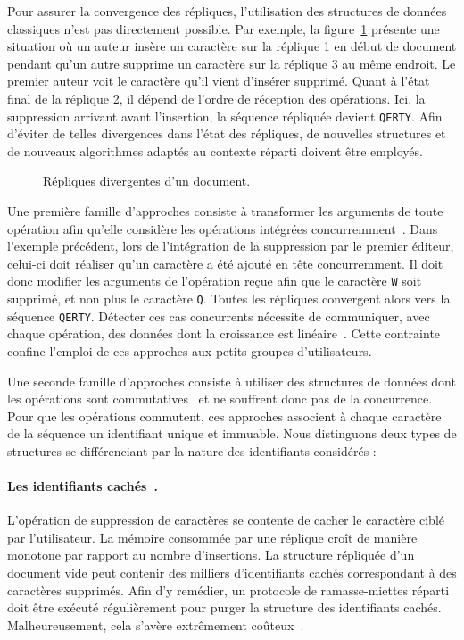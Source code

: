 Pour assurer la convergence des répliques, l'utilisation des structures de
données \og classiques \fg n'est pas directement possible.
Par exemple, la figure~\ref{intro:fig:ripconvergence} présente une situation où
un auteur insère un caractère sur la réplique 1 en début de document pendant
qu'un autre supprime un caractère sur la réplique 3 au même endroit. Le premier
auteur voit le caractère qu'il vient d'insérer supprimé. Quant à l'état final de
la réplique 2, il dépend de l'ordre de réception des opérations. Ici, la
suppression arrivant avant l'insertion, la séquence répliquée devient
\texttt{QERTY}.  Afin d'éviter de telles divergences dans l'état des répliques,
de nouvelles structures et de nouveaux algorithmes adaptés au contexte réparti
doivent être employés.


\begin{figure}
  
  \caption{\label{intro:fig:ripconvergence} Répliques divergentes d'un
    document.}
\end{figure}


Une première famille d'approches consiste à transformer les arguments de toute
opération afin qu'elle considère les opérations intégrées
concurremment~\cite{sun1998operational}. Dans l'exemple précédent, lors de
l'intégration de la suppression par le premier éditeur, celui-ci doit réaliser
qu'un caractère a été ajouté en tête concurremment. Il doit donc modifier les
arguments de l'opération reçue afin que le caractère \texttt{W} soit supprimé,
et non plus le caractère \texttt{Q}. Toutes les répliques convergent alors vers
la séquence \texttt{QERTY}.  Détecter ces cas concurrents nécessite de
communiquer, avec chaque opération, des données dont la croissance est
linéaire~\cite{charronbost1991concerning, sun2009contextbased}. Cette contrainte
confine l'emploi de ces approches aux petits groupes d'utilisateurs.

Une seconde famille d'approches consiste à utiliser des structures de données
dont les opérations sont commutatives~\cite{shapiro2011conflict} et ne souffrent
donc pas de la concurrence. Pour que les opérations commutent, ces approches
associent à chaque caractère de la séquence un identifiant unique et
immuable. Nous distinguons deux types de structures se différenciant par la
nature des identifiants considérés :

\paragraph{Les identifiants cachés~\cite{oster2006data}.} L'opération de
suppression de caractères se contente de cacher le caractère ciblé par
l'utilisateur. La mémoire consommée par une réplique croît de manière monotone
par rapport au nombre d'insertions.
La structure répliquée d'un document vide peut contenir des milliers
d'identifiants cachés correspondant à des caractères supprimés.  Afin d'y
remédier, un protocole de ramasse-miettes réparti~\cite{abdullahi1998garbage}
doit être exécuté régulièrement pour purger la structure des identifiants
cachés. Malheureusement, cela s'avère extrêmement
coûteux~\cite{abdullahi1998garbage}.

